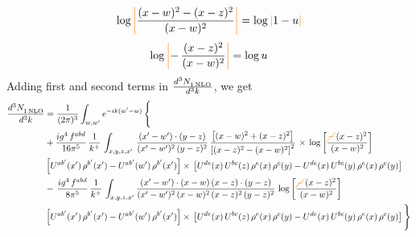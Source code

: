 \documentclass[9pt]{article}
\numberwithin{equation}{section}
\begin{document}
$$\log{\textcolor{orange}{\left|\textcolor{black}{\frac{(x-w)^{2}-(x-z)^{2}}{(x-w)^{2}}}\right|}} = \log{\textcolor{orange}{|}1-u\textcolor{orange}{|}}$$
$$\log{\textcolor{orange}{\left|\textcolor{black}{-\,\frac{(x-z)^{2}}{(x-w)^{2}}}\right|}} = \log{u}$$
Adding first and second terms in $ \frac{d^{3}N_{1\,\rm NLO}^{\rm}}{d^{3}k} $, we get
\begin{align}
   \frac{d^{3}N_{1\,\rm NLO}^{\rm}}{d^{3}k}  & =  \frac{1}{(2\pi)^{3}}  \int_{w, w^\prime} e^{-ik(w^\prime-w)}\, \Bigg\{\notag \\
&  +\frac{ig^{4}\,f^{abd}}{16\pi^{5}}\, \frac{1}{k^{+}}\,\int_{x,y,z,x'}\, \frac{(x'-w')\cdot (y-z)}{(x'-w')^{2}\,(y-z)^{2}}\, \frac{\left[(x-w)^{2}+(x-z)^{2}\right]}{\left[(x-z)^{2}-(x-w)^{2}\right]^{2}}\, \times\, \log{\left[\frac{\textcolor{orange}{\cancel{-}}\,(x-z)^{2}}{(x-w)^{2}}\right]}\notag \\ & \left[U^{ab'}(x')\,\rho^{b'}(x')-U^{ab'}(w')\, \rho^{b'}(x')\right]\times\, \left[U^{de}(x)\,U^{bc}(z)\, \rho^{e}(x)\,\rho^{c}(y)-U^{de}(x)\,U^{bc}(y)\,\rho^{e}(x)\,\rho^{c}(y)\right] \notag \\
& -\, \frac{ig^{4}\,f^{abd}}{8\pi^{5}}\,\frac{1}{k^{+}}\,\int_{x,y,z,x'}\frac{(x'-w')\cdot (x-w)\, (x-z)\cdot (y-z)}{(x'-w')^{2}\, (x-w)^{2}\, (x-z)^{2}\, (y-z)^{2}}\,\log{\left[\frac{\textcolor{orange}{\cancel{-}}\,(x-z)^{2}}{(x-w)^{2}}\right]} \notag \\ & \left[U^{ab'}(x')\,\rho^{b'}(x')-U^{ab'}(w')\, \rho^{b'}(x')\right]\times\, \left[U^{de}(x)\,U^{bc}(z)\, \rho^{e}(x)\,\rho^{c}(y)-U^{de}(x)\,U^{bc}(y)\,\rho^{e}(x)\,\rho^{c}(y)\right]\Bigg\}
\end{align}
\end{document}
